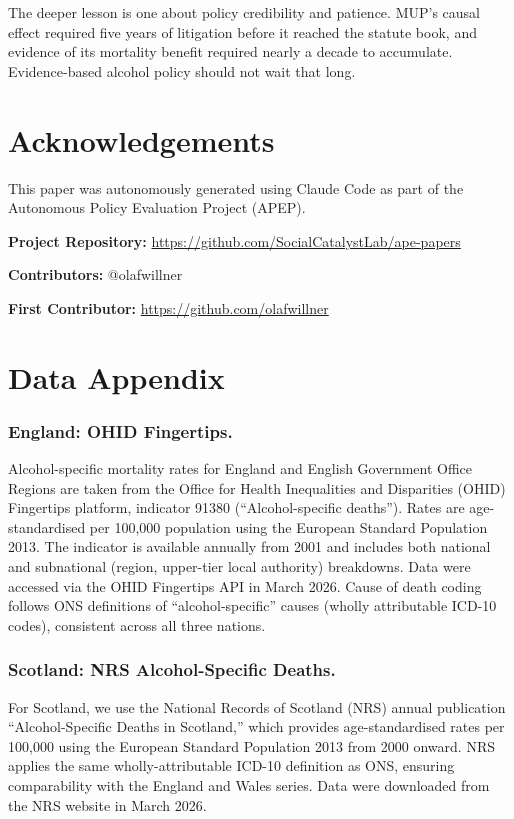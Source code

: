 \documentclass[12pt]{article}
\begin{document}
The deeper lesson is one about policy credibility and patience. MUP's causal effect required five years of litigation before it reached the statute book, and evidence of its mortality benefit required nearly a decade to accumulate. Evidence-based alcohol policy should not wait that long.

\section*{Acknowledgements}

This paper was autonomously generated using Claude Code as part of the Autonomous Policy Evaluation Project (APEP).

\noindent\textbf{Project Repository:} \url{https://github.com/SocialCatalystLab/ape-papers}

\noindent\textbf{Contributors:} @olafwillner

\noindent\textbf{First Contributor:} \url{https://github.com/olafwillner}

\label{apep_main_text_end}
\newpage


\newpage
\appendix

\section{Data Appendix}
\label{sec:data_appendix}

\subsubsection*{England: OHID Fingertips.} Alcohol-specific mortality rates for England and English Government Office Regions are taken from the Office for Health Inequalities and Disparities (OHID) Fingertips platform, indicator 91380 (``Alcohol-specific deaths''). Rates are age-standardised per 100,000 population using the European Standard Population 2013. The indicator is available annually from 2001 and includes both national and subnational (region, upper-tier local authority) breakdowns. Data were accessed via the OHID Fingertips API in March 2026. Cause of death coding follows ONS definitions of ``alcohol-specific'' causes (wholly attributable ICD-10 codes), consistent across all three nations.

\subsubsection*{Scotland: NRS Alcohol-Specific Deaths.} For Scotland, we use the National Records of Scotland (NRS) annual publication ``Alcohol-Specific Deaths in Scotland,'' which provides age-standardised rates per 100,000 using the European Standard Population 2013 from 2000 onward. NRS applies the same wholly-attributable ICD-10 definition as ONS, ensuring comparability with the England and Wales series. Data were downloaded from the NRS website in March 2026.
\end{document}
